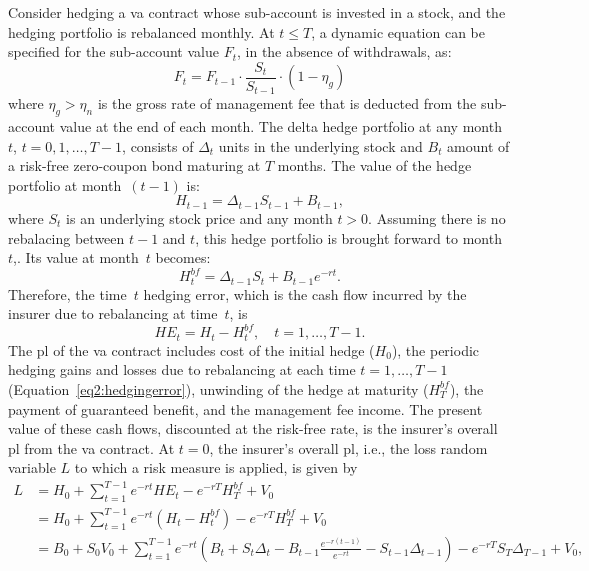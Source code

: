 Consider hedging a \gls{va} contract whose sub-account is invested in a stock, and the hedging portfolio is rebalanced monthly.
At $t \leq T$, a dynamic equation can be specified for the sub-account value $F_t$, in the absence of withdrawals, as:
\begin{equation*}
    F_t = F_{t-1} \cdot \frac{S_t}{S_{t-1}} \cdot (1-\eta_g)
\end{equation*}
where $\eta_g> \eta_n$ is the gross rate of management fee that is deducted from the sub-account value at the end of each month.
The delta hedge portfolio at any month~$t$, $t=0,1,\ldots,T-1$, consists of $\Delta_t$ units in the underlying stock and $B_t$ amount of a risk-free zero-coupon bond maturing at $T$ months.
The value of the hedge portfolio at month~$(t-1)$ is:
\begin{equation*}
    H_{t-1} = \Delta_{t-1} S_{t-1} + B_{t-1},
\end{equation*}
where $S_t$ is an underlying stock price and any month $t>0$.
Assuming there is no rebalacing between $t-1$ and $t$, this hedge portfolio is brought forward to month~$t$,.
Its value at month~$t$ becomes:
\begin{equation*}
    H_{t}^{bf} = \Delta_{t-1} S_{t} + B_{t-1}e^{-rt}.
\end{equation*}
Therefore, the time~$t$ hedging error, which is the cash flow incurred by the insurer due to rebalancing at time~$t$, is
\begin{equation}\label{eq2:hedgingerror}
    HE_t = H_t - H^{bf}_t, \quad t=1,\ldots, T-1.
\end{equation}
The \gls{pl} of the \gls{va} contract includes cost of the initial hedge ($H_0$), the periodic hedging gains and losses due to rebalancing at each time $t=1,\ldots,T-1$ (Equation~\ref{eq2:hedgingerror}), unwinding of the hedge at maturity ($H^{bf}_T$), the payment of guaranteed benefit, and the management fee income.
The present value of these cash flows, discounted at the risk-free rate, is the insurer's overall \gls{pl} from the \gls{va} contract.
At $t=0$, the insurer's overall \gls{pl}, i.e., the loss random variable $L$ to which a risk measure is applied, is given by
\begin{align}\label{eq2:lossrvtw}
L & = H_0 + \sum_{t=1}^{T-1} e^{-rt} HE_t - e^{-rT} H^{bf}_T + V_0  \nonumber \\
  & = H_0 + \sum_{t=1}^{T-1} e^{-rt} (H_t - H_t^{bf}) - e^{-rT} H^{bf}_T + V_0  \nonumber \\
  & = B_0 + S_0 V_0 + \sum_{t=1}^{T-1} e^{-rt} \left( B_t + S_t \Delta_t - B_{t-1} \frac{e^{-r(t-1)}}{e^{-rt}} - S_{t-1} \Delta_{t-1}  \right) - e^{-rT} S_T \Delta_{T-1} + V_0,  
\end{align}
